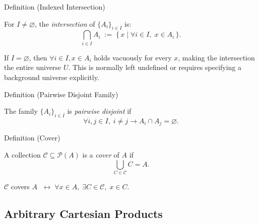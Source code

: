 \begin{definitionbox}{Definition (Indexed Intersection)}
\begin{definition}\label{def:indexed-intersection}
For $I \neq \varnothing$, the \emph{intersection} of $\{A_i\}_{i \in I}$ is:
\[
\bigcap_{i \in I} A_i
\;:=\;
\{\, x \mid \forall i \in I,\; x \in A_i \,\}.
\]
\end{definition}
\end{definitionbox}

\begin{remark*}
If $I = \varnothing$, then $\forall i \in I, x \in A_i$ holds vacuously for
every $x$, making the intersection the entire universe $U$. This is normally
left undefined or requires specifying a background universe explicitly.
\end{remark*}

\begin{definitionbox}{Definition (Pairwise Disjoint Family)}
\begin{definition}\label{def:pairwise-disjoint}
The family $\{A_i\}_{i \in I}$ is \emph{pairwise disjoint} if
\[
\forall i,j \in I,\;
i \neq j \rightarrow A_i \cap A_j = \varnothing.
\]
\end{definition}
\end{definitionbox}

\begin{definitionbox}{Definition (Cover)}
\begin{definition}[Cover]\label{def:set-cover}
A collection $\mathcal{C} \subseteq \mathcal{P}(A)$ is a \emph{cover} of $A$ if
\[
\bigcup_{C \in \mathcal{C}} C = A.
\]
\end{definition}
\end{definitionbox}

\NoLocalDependencies

\begin{remark*}
$\mathcal{C}$ covers $A$ $\;\leftrightarrow\; \forall x \in A,\; \exists C \in \mathcal{C},\; x \in C$.
\end{remark*}

\begin{exposition}
\vspace{1em}
\end{exposition}
\subsection*{Arbitrary Cartesian Products}

